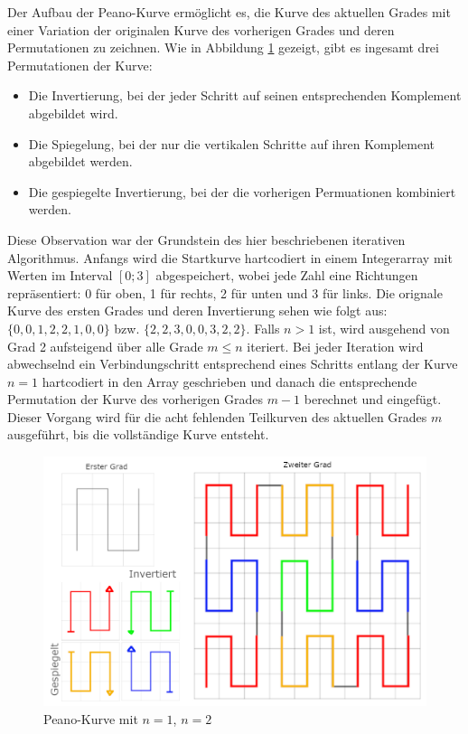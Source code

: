 \documentclass[course=asp]{aspdoc}
\begin{document}
Der Aufbau der Peano-Kurve erm\"oglicht es, die Kurve des aktuellen Grades mit einer Variation der originalen Kurve des vorherigen Grades und deren Permutationen zu zeichnen. Wie in Abbildung \ref{Abb:Peano L\"osungsidee} gezeigt, gibt es ingesamt drei Permutationen der Kurve:

\begin{itemize}
    \item Die Invertierung, bei der jeder Schritt auf seinen entsprechenden Komplement abgebildet wird.
    \item Die Spiegelung, bei der nur die vertikalen Schritte auf ihren Komplement abgebildet werden.
    \item Die gespiegelte Invertierung, bei der die vorherigen Permuationen kombiniert werden.
\end{itemize}

Diese Observation war der Grundstein des hier beschriebenen iterativen Algorithmus. Anfangs wird die Startkurve hartcodiert in einem Integerarray mit Werten im Interval $[0;3]$ abgespeichert, wobei jede Zahl eine Richtungen repr\"asentiert: 0 f\"ur oben, 1 f\"ur rechts, 2 f\"ur unten und 3 f\"ur links. Die orignale Kurve des ersten Grades und deren Invertierung sehen wie folgt aus: $\{0, 0, 1, 2, 2, 1, 0, 0\}$ bzw. $\{2, 2, 3, 0, 0, 3, 2, 2\}$. 
Falls $n > 1$ ist, wird ausgehend von Grad 2 aufsteigend \"uber alle Grade $m \leq n$ iteriert. Bei jeder Iteration wird abwechselnd ein Verbindungschritt entsprechend eines Schritts entlang der Kurve $n = 1$ hartcodiert in den Array geschrieben und danach die entsprechende Permutation der Kurve des vorherigen Grades $m - 1$ berechnet und eingef\"ugt. Dieser Vorgang wird f\"ur die acht fehlenden Teilkurven des aktuellen Grades $m$ ausgef\"uhrt, bis die vollst\"andige Kurve entsteht.

\begin{figure}[ht]
\centering
\includegraphics[scale=0.3]{PeanoFarbcodiert.png}
\caption{Peano-Kurve mit $n = 1$, $n = 2$}\label{Abb:Peano L\"osungsidee}
\captionsetup[figure]{font=small,labelfont=small}
\end{figure}
\end{document}
